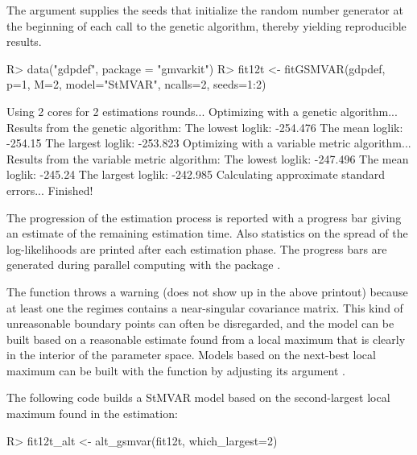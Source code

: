 \documentclass[nojss]{jss} %
\begin{document}
The argument  supplies the seeds that initialize the random number generator at the beginning of each call to the genetic algorithm, thereby yielding reproducible results.
%
\begin{Schunk}
\begin{Sinput}
R> data("gdpdef", package = "gmvarkit")
R> fit12t <- fitGSMVAR(gdpdef, p=1, M=2, model="StMVAR", ncalls=2, seeds=1:2)
\end{Sinput}
\begin{Soutput}
Using 2 cores for 2 estimations rounds... 
Optimizing with a genetic algorithm...
Results from the genetic algorithm:
The lowest loglik:  -254.476 
The mean loglik:    -254.15 
The largest loglik: -253.823 
Optimizing with a variable metric algorithm...
Results from the variable metric algorithm:
The lowest loglik:  -247.496 
The mean loglik:    -245.24 
The largest loglik: -242.985 
Calculating approximate standard errors...
Finished!
\end{Soutput}
\end{Schunk}
%

The progression of the estimation process is reported with a progress bar giving an estimate of the remaining estimation time. Also statistics on the spread of the log-likelihoods are printed after each estimation phase. The progress bars are generated during parallel computing with the package  \citep{Solymos+Zawadzki:2020}.

The function throws a warning (does not show up in the above printout) because at least one the regimes contains a near-singular covariance matrix. This kind of unreasonable boundary points can often be disregarded, and the model can be built based on a reasonable estimate found from a local maximum that is clearly in the interior of the parameter space. Models based on the next-best local maximum can be built with the function  by adjusting its argument .

The following code builds a StMVAR model based on the second-largest local maximum found in the estimation:
%
\begin{Schunk}
\begin{Sinput}
R> fit12t_alt <- alt_gsmvar(fit12t, which_largest=2)
\end{Sinput}
\end{Schunk}
%
\end{document}
